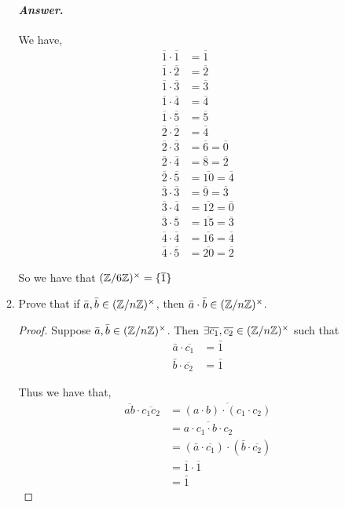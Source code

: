 \documentclass[11pt, reqno]{amsart}
\theoremstyle{plain}
\theoremstyle{definition}
\theoremstyle{example}
\newenvironment{ans}{\color{black}\medskip \paragraph*{\emph{Answer}.}}{\hfill \break  $~\!\!$ \dotfill \medskip }
\begin{document}
\begin{enumerate}[1.]
\begin{enumerate}
\begin{ans}
We have,
\begin{align*}
\overline{1} \cdot \overline{1} &= \overline{1}\\
\overline{1} \cdot \overline{2} &= \overline{2}\\
\overline{1} \cdot \overline{3} &= \overline{3}\\
\overline{1} \cdot \overline{4} &= \overline{4}\\
\overline{1} \cdot \overline{5} &= \overline{5}\\
\overline{2} \cdot \overline{2} &= \overline{4}\\
\overline{2} \cdot \overline{3} &= \overline{6} = \overline{0}\\
\overline{2} \cdot \overline{4} &= \overline{8} = \overline{2}\\
\overline{2} \cdot \overline{5} &= \overline{10} = \overline{4}\\
\overline{3} \cdot \overline{3} &= \overline{9} = \overline{3}\\
\overline{3} \cdot \overline{4} &= \overline{12} = \overline{0}\\
\overline{3} \cdot \overline{5} &= \overline{15} = \overline{3}\\
\overline{4} \cdot \overline{4} &= \overline{16} = \overline{4}\\
\overline{4} \cdot \overline{5} &= \overline{20} = \overline{2}
\end{align*}

So we have that $(\mathbb{Z}/6\mathbb{Z})^{\times} = \{\overline{1}\}$\\

\end{ans}
	
\item Prove that if $\bar{a}, \bar{b} \in (\mathbb{Z}/n\mathbb{Z})^\times$, then $\bar{a} \cdot \bar{b} \in (\mathbb{Z}/n\mathbb{Z})^\times$.\\


\begin{proof}
Suppose $\bar{a}, \bar{b} \in (\mathbb{Z}/n\mathbb{Z})^\times$. Then $\exists \overline{c_1}, \overline{c_2} \in (\mathbb{Z}/n\mathbb{Z})^\times$ such that 
\begin{align*}
\bar{a} \cdot \overline{c_1} &= \bar{1}\\
\bar{b} \cdot \overline{c_2} &= \bar{1}
\end{align*}

Thus we have that,
\begin{align}
\overline{ab} \cdot \overline{c_1c_2} &= \overline{(a \cdot b) \cdot (c_1 \cdot c_2)}\\
&= \overline{a \cdot c_1 \cdot b \cdot c_2} \nonumber \\
&= (\bar{a} \cdot \overline{c_1}) \cdot (\bar{b} \cdot \overline{c_2}) \nonumber \\
&= \overline{1} \cdot \overline{1} \nonumber \\
&= \bar{1} \nonumber
\end{align}


\end{proof}
\end{enumerate}
\end{enumerate}
\end{document}
